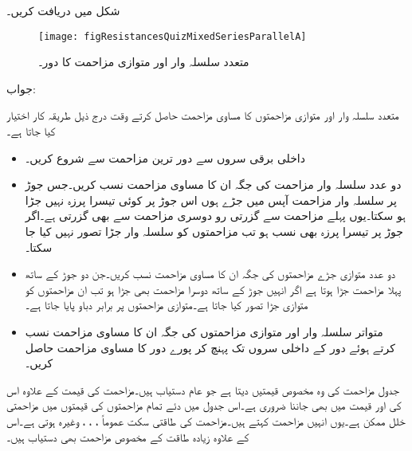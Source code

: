 شکل  میں  دریافت کریں۔
\begin{figure}
\centering
\texttt{[image: figResistancesQuizMixedSeriesParallelA]}
\caption{متعدد سلسلہ وار اور متوازی مزاحمت کا  دور۔}
\label{شکل_مزاحمتی_مشق_متعدد_مزاحمت}
\end{figure}

جواب:

متعدد سلسلہ وار اور متوازی مزاحمتوں کا مساوی مزاحمت حاصل کرتے وقت درج ذیل طریقہ کار اختیار کیا جاتا ہے۔
\begin{itemize}
\item
داخلی برقی سروں سے دور ترین  مزاحمت سے شروع کریں۔
\item
دو عدد سلسلہ وار مزاحمت کی جگہ ان کا مساوی مزاحمت  نسب کریں۔جس جوڑ پر سلسلہ وار مزاحمت آپس میں جڑے ہوں اس جوڑ پر کوئی تیسرا پرزہ نہیں جڑا ہو سکتا۔یوں پہلے مزاحمت سے گزرتی رو دوسری مزاحمت سے بھی گزرتی ہے۔اگر جوڑ پر تیسرا پرزہ بھی نسب ہو تب مزاحمتوں کو سلسلہ وار جڑا تصور نہیں کیا جا سکتا۔
\item
دو عدد متوازی جڑے مزاحمتوں کی جگہ ان کا مساوی مزاحمت  نسب کریں۔جن دو جوڑ کے ساتھ پہلا مزاحمت جڑا ہوتا ہے اگر انہیں جوڑ کے ساتھ دوسرا مزاحمت بھی جڑا ہو تب ان مزاحمتوں کو متوازی جڑا تصور کیا جاتا ہے۔متوازی مزاحمتوں پر برابر دباو پایا جاتا ہے۔
\item
متواتر سلسلہ وار اور متوازی مزاحمتوں کی جگہ ان کا مساوی مزاحمت نسب کرتے ہوئے دور کے داخلی سروں تک پہنچ کر پورے دور کا مساوی مزاحمت حاصل کریں۔
\end{itemize}

جدول  مزاحمت کی وہ مخصوص  قیمتیں دیتا ہے جو عام دستیاب ہیں۔مزاحمت کی قیمت کے علاوہ اس کی  اور قیمت میں  بھی جاننا ضروری ہے۔اس جدول میں دئے تمام مزاحمتوں کی قیمتوں میں  مزاحمتی خلل ممکن ہے۔یوں انہیں  مزاحمت کہتے ہیں۔مزاحمت کی طاقتی سکت عموماً ، ، ،  وغیرہ ہوتی ہے۔اس کے علاوہ زیادہ طاقت کے  مخصوص مزاحمت بھی دستیاب ہیں۔


